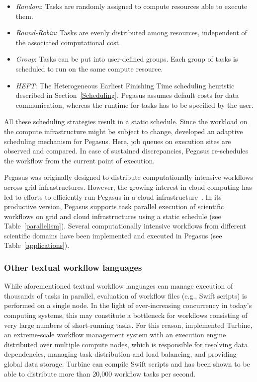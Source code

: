\begin{itemize}
	\item \textit{Random}: Tasks are randomly assigned to compute resources able to execute them.
	\item \textit{Round-Robin}: Tasks are evenly distributed among resources, independent of the associated computational cost.
	\item \textit{Group}: Tasks can be put into user-defined groups. Each group of tasks is scheduled to run on the same compute resource.
	\item \textit{HEFT}: The Heterogeneous Earliest Finishing Time scheduling heuristic~\citep{Topcuoglu2002} described in Section~\ref{Scheduling}. Pegasus assumes default costs for data communication, whereas the runtime for tasks has to be specified by the user.
\end{itemize}

All these scheduling strategies result in a static schedule. Since the workload on the compute infrastructure might be subject to change, \citet{Lee2009} developed an adaptive scheduling mechanism for Pegasus. Here, job queues on execution sites are observed and compared. In case of sustained discrepancies, Pegasus re-schedules the workflow from the current point of execution.

Pegasus was originally designed to distribute computationally intensive workflows across grid infrastructures. However, the growing interest in cloud computing has led to efforts to efficiently run Pegasus in a cloud infrastructure~\citep{Hoffa08,Juve09,Juve11}. In its productive version, Pegasus supports task parallel execution of scientific workflows on grid and cloud infrastructures using a static schedule (see Table~\ref{parallelism}). Several computationally intensive workflows from different scientific domains have been implemented and executed in Pegasus (see Table~\ref{applications}).

\subsubsection{Other textual workflow languages}
While aforementioned textual workflow languages can manage execution of thousands of tasks in parallel, evaluation of workflow files (e.g., Swift scripts) is performed on a single node. In the light of ever-increasing concurrency in today's computing systems, this may constitute a bottleneck for workflows consisting of very large numbers of short-running tasks. For this reason, \citet{Wozniak2012} implemented Turbine, an extreme-scale workflow management system with an execution engine distributed over multiple compute nodes, which is responsible for resolving data dependencies, managing task distribution and load balancing, and providing global data storage. Turbine can compile Swift scripts and has been shown to be able to distribute more than 20,000 workflow tasks per second.

